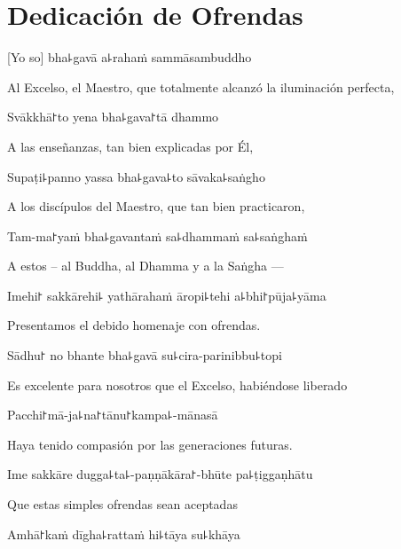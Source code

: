 \chapter{Dedicación de Ofrendas}

[Yo so] bha꜕gavā a꜕rahaṁ sammāsambuddho

\begin{english}
Al Excelso, el Maestro, que totalmente alcanzó la iluminación perfecta,
\end{english}

Svākkhā꜓to yena bha꜕gava꜓tā dhammo

\begin{english}
A las enseñanzas, tan bien explicadas por Él,
\end{english}

Supaṭi꜕panno yassa bha꜕gava꜕to sāvaka꜕saṅgho

\begin{english}
A los discípulos del Maestro, que tan bien practicaron,
\end{english}

Tam-ma꜓yaṁ bha꜕gavantaṁ sa꜕dhammaṁ sa꜕saṅghaṁ

\begin{english}
A estos – al Buddha, al Dhamma y a la Saṅgha ---
\end{english}

Imehi꜓ sakkārehi꜕ yathārahaṁ āropi꜕tehi a꜕bhi꜓pūja꜕yāma

\begin{english}
Presentamos el debido homenaje con ofrendas.
\end{english}

Sādhu꜓ no bhante bha꜕gavā su꜕cira-parinibbu꜕topi

\begin{english}
Es excelente para nosotros que el Excelso, habiéndose liberado
\end{english}

Pacchi꜓mā-ja꜕na꜓tānu꜓kampa꜕-mānasā

\begin{english}
Haya tenido compasión por las generaciones futuras.
\end{english}

Ime sakkāre dugga꜕ta꜕-paṇṇākāra꜓-bhūte pa꜕ṭiggaṇhātu

\begin{english}
Que estas simples ofrendas sean aceptadas
\end{english}

Amhā꜓kaṁ dīgha꜕rattaṁ hi꜕tāya su꜕khāya

